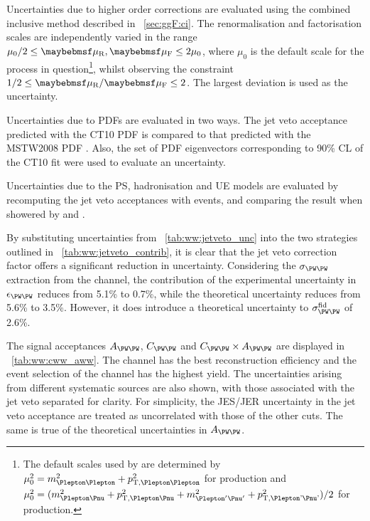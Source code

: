 Uncertainties due to higher order corrections are evaluated using the combined inclusive 
method described in \Section~\ref{sec:ggF:ci}. The renormalisation and factorisation 
scales are independently varied in the range $\mu_0/2 \leq \mur,\muf \leq 2\mu_0$, where 
$\mu_0$ is the default scale for the process in question\footnote{
	The default scales used by \mcatnlo are determined by 
	$\mu_0^2 = m_{\Plepton\Plepton}^2 + p_{\text{T,\HepProcess{\Plepton\Plepton}}}^2$ 
	for \PZ production and 
	$\mu_0^2 = (m_{\Plepton\Pnu}^2 + p_{\text{T,\HepProcess{\Plepton\Pnu}}}^2 + 
	m_{\Plepton'\Pnu'}^2 + p_{\text{T,\HepProcess{\Plepton'\Pnu'}}}^2) / 2$
	for \WW production.
}, whilst observing the constraint $1/2 \leq \mur/\muf \leq 2$. The largest deviation is 
used as the uncertainty.

Uncertainties due to \acp{PDF} are evaluated in two ways. The jet veto acceptance 
predicted with the CT10 PDF is compared to that predicted with the MSTW2008 PDF 
\cite{MSTW}. Also, the set of PDF eigenvectors corresponding to 90\% \ac{CL} of the CT10 
fit were used to evaluate an uncertainty.

Uncertainties due to the \ac{PS}, hadronisation and \ac{UE} models are evaluated by 
recomputing the jet veto acceptances with \powhegbox events, and comparing the result 
when showered by \fherwig and .

By substituting uncertainties from \Table~\ref{tab:ww:jetveto_unc} into the two 
strategies outlined in \Table~\ref{tab:ww:jetveto_contrib}, it is clear that the jet veto 
correction factor offers a significant reduction in uncertainty. Considering the 
$\sigma_{\WW}$ extraction from the \emch channel, the contribution of the experimental 
uncertainty in $\epsilon_{\WW}$ reduces from 5.1\% to 0.7\%, while the theoretical 
uncertainty reduces from 5.6\% to 3.5\%. However, it does introduce a theoretical 
uncertainty to $\sigma^{\text{fid}}_{\WW}$ of 2.6\%.

The signal acceptances $A_{\WW}$, $C_{\WW}$ and $C_{\WW} \times A_{\WW}$ are displayed in 
\Table~\ref{tab:ww:cww_aww}. The \mmch channel has the best reconstruction efficiency and 
the event selection of the \emch channel has the highest yield. The uncertainties arising 
from different systematic sources are also shown, with those associated with the jet veto 
separated for clarity. For simplicity, the JES/JER uncertainty in the jet veto acceptance 
are treated as uncorrelated with those of the other cuts. The same is true of the 
theoretical uncertainties in $A_{\WW}$. 

